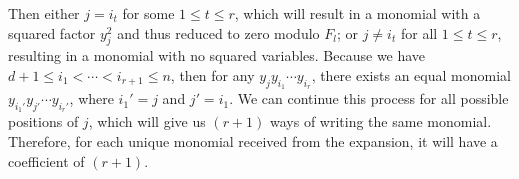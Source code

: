 \documentclass[12pt,reqno]{amsart}
\theoremstyle{plain}
\theoremstyle{definition}
\begin{document}
Then either $j = i_t$ for some $1 \leq t \leq r$, which will result in a monomial with a squared factor $y_j^2$ and thus reduced to zero modulo $F_l$; or $j \ne i_t$ for all $1 \leq t \leq r$, resulting in a monomial with no squared variables. Because we have $d+1 \leq i_1 < \cdots < i_{r+1} \leq n$, then for any $y_j y_{i_1} \cdots y_{i_r}$, there exists an equal monomial $y_{i_1'} y_{j'} \cdots y_{i_r'}$, where $i_1' = j$ and $j' = i_1$. We can continue this process for all possible positions of $j$, which will give us $(r+1)$ ways of writing the same monomial. Therefore, for each unique monomial received from the expansion, it will have a coefficient of $(r+1)$.


	
	
	
	
	


\newpage

\small
%  
  
%  
%  
%

\end{document}
